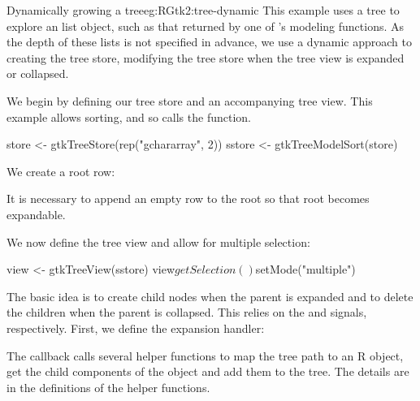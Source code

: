 \begin{example}{Dynamically growing a tree}{eg:RGtk2:tree-dynamic}
This example uses a tree to explore an \R\/ list object, such as that
returned by one of \R's modeling functions.  As the depth of these
lists is not specified in advance, we use a dynamic approach to
creating the tree store, modifying the tree store when the tree view
is expanded or collapsed.
  

We begin by defining our tree store and an accompanying tree
view. This example allows sorting, and so calls the
 function.
\begin{Schunk}
\begin{Sinput}
 store <- gtkTreeStore(rep("gchararray", 2))
 sstore <- gtkTreeModelSort(store)
\end{Sinput}
\end{Schunk}

We create a root row:
\begin{Schunk}
\end{Schunk}
%
It is necessary to append an empty row to the root so that root
becomes expandable.

We now define the tree view and allow for multiple selection:
\begin{Schunk}
\begin{Sinput}
 view <- gtkTreeView(sstore)
 view$getSelection()$setMode("multiple")
\end{Sinput}
\end{Schunk}

The basic idea is to create child nodes when the parent is expanded
and to delete the children when the parent is collapsed. This relies
on the  and  signals,
respectively. First, we define the expansion handler:
\begin{Schunk}
\end{Schunk}
%
The callback calls several helper functions to map the tree path to an
R object, get the child components of the object and add them to the
tree. The details are in the definitions of the helper functions.


\end{example}
